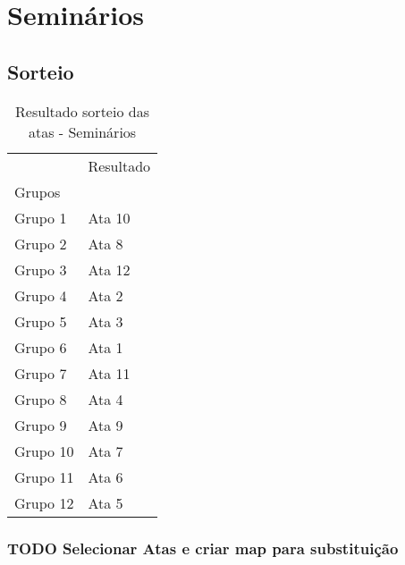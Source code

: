 \documentclass[11pt]{article}
\begin{document}
\section{Seminários}
\label{sec:org81384fa}
\subsection{Sorteio}
\label{sec:orgf557a80}
\begin{table}
\centering
\caption{Resultado sorteio das atas - Seminários}
\begin{tabular}{ll}
\toprule
{} & Resultado \\
Grupos   &           \\
\midrule
Grupo 1  &    Ata 10 \\
Grupo 2  &     Ata 8 \\
Grupo 3  &    Ata 12 \\
Grupo 4  &     Ata 2 \\
Grupo 5  &     Ata 3 \\
Grupo 6  &     Ata 1 \\
Grupo 7  &    Ata 11 \\
Grupo 8  &     Ata 4 \\
Grupo 9  &     Ata 9 \\
Grupo 10 &     Ata 7 \\
Grupo 11 &     Ata 6 \\
Grupo 12 &     Ata 5 \\
\bottomrule
\end{tabular}
\end{table}

\subsubsection{{\bfseries\sffamily TODO} Selecionar Atas e criar map para substituição}
\label{sec:orgc3a5012}
\end{document}
